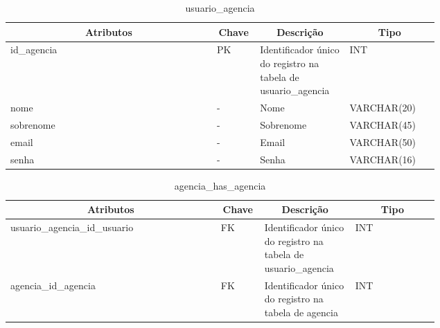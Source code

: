 \begin{enumerate}
    \begin{table}[H]
    \caption{usuario\_agencia}
    \label{idioma}
    	\centering\footnotesize
        \begin{tabular}{|p{0.40\linewidth} | p{0.04\linewidth} |  p{0.12\linewidth} | p{0.16\linewidth} |}  \hline
        \multicolumn{1}{|c|}{\textbf{Atributos}} &
        \multicolumn{1}{|c|}{\textbf{Chave}} &
        \multicolumn{1}{c|}{\textbf{Descrição}} &
        \multicolumn{1}{c|}{\textbf{Tipo}} \\ \hline
          
        id\_agencia &  
        PK & 
        Identificador único do registro na tabela de usuario\_agencia &
        INT
        \\  \hline
        
        nome  &  
        - & 
        Nome &
        VARCHAR(20)
        \\  \hline
        
        sobrenome  &  
        - & 
        Sobrenome &
        VARCHAR(45)
        \\  \hline
        
        email  &  
        - & 
        Email &
        VARCHAR(50)
        \\  \hline
        
        senha  &  
        - & 
        Senha &
        VARCHAR(16)
        \\  \hline
       
        \end{tabular}
    \end{table}
\end{enumerate}

\begin{enumerate}
    \begin{table}[H]
    \caption{agencia\_has\_agencia}
    \label{idioma}
    	\centering\footnotesize
        \begin{tabular}{|p{0.40\linewidth} | p{0.04\linewidth} |  p{0.12\linewidth} | p{0.16\linewidth} |}  \hline
        \multicolumn{1}{|c|}{\textbf{Atributos}} &
        \multicolumn{1}{|c|}{\textbf{Chave}} &
        \multicolumn{1}{c|}{\textbf{Descrição}} &
        \multicolumn{1}{c|}{\textbf{Tipo}} \\ \hline
          
        usuario\_agencia\_id\_usuario  &  
        FK & 
        Identificador único do registro na tabela de usuario\_agencia &
        INT
        \\  \hline
        
        agencia\_id\_agencia &  
        FK & 
        Identificador único do registro na tabela de agencia &
        INT
        \\  \hline
       
        \end{tabular}
    \end{table}
\end{enumerate}

